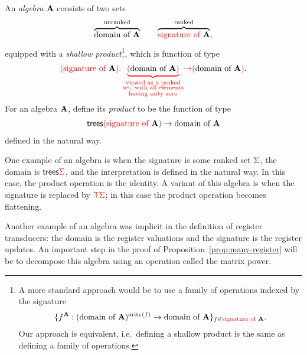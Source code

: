 \begin{definition}
    An \emph{algebra} ${\color{black}\mathbf A}$ consists of two sets 
    \begin{align*}
    \overbrace{{\color{black}\text{domain of }}{\color{black}\mathbf A}}^{\text{unranked}} \qquad \overbrace{{\color{red}{\text{signature of }}}{\color{black}\mathbf A}}^{\text{ranked}},
    \end{align*}
equipped with a  \emph{shallow product}\footnote{
    A more standard approach would be to use a family of operations indexed by the signature
    \begin{align*}
    \{f^{\color{black}\mathbf A} : ({\color{black}\text{domain of }}{\color{black}\mathbf A})^{\mathrm{arity}(f)} \to {\color{black}\text{domain of }}{\color{black}\mathbf A}\}_{f \in {\color{red}{\text{signature of }}}{\color{black}\mathbf A}}.
    \end{align*}
   Our approach is equivalent, i.e.~defining a shallow product is the same as defining a family of operations.
}, which is function of type
\begin{align*}
 {\color{red}{({\color{red}{\text{signature of }}}{\color{black}\mathbf A}) . \underbrace{({\color{black}\text{domain of }}{\color{black}\mathbf A})}_{\substack{\text{viewed as a ranked}\\ \text{set, with all elements}\\ \text{having arity zero}}}}} {\color{red}{\to}} {\color{red}{(}}{\color{black}\text{domain of }}{\color{black}\mathbf A}{\color{red}{)}}.
\end{align*}
    For an algebra ${\color{black}\mathbf A}$, define its \emph{product} to be the function of type
    \begin{align*}
        \mathsf {trees} {\color{red}{(}}{\color{red}{\text{signature of }}}{\color{black}\mathbf A}{\color{red}{)}} \to {\color{black}\text{domain of }}{\color{black}\mathbf A}
    \end{align*}
    defined in the natural way.
\end{definition}


One example of an algebra is when the signature is some ranked set ${\color{red}{\Sigma}}$, the domain is  $\mathsf {trees} {\color{red}{\Sigma}}$, and the interpretation is defined in the natural way. In this case, the product operation is the identity. A variant of this algebra is when the signature is replaced by ${\color{red}{\mathsf T}} {\color{red}{\Sigma}}$; in this case the product operation becomes flattening. 

Another example of an algebra was implicit in the definition of register transducers: the domain is the register valuations and the signature is the  register updates. An important step in the proof of Proposition~\ref{prop:many-register} will be to decompose this algebra using an operation called the matrix power.



